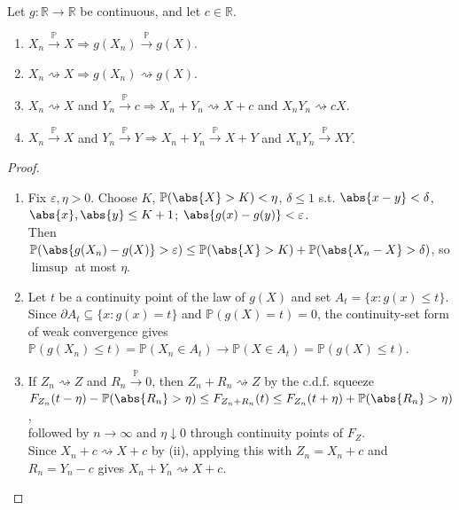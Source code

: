 \begin{theorem} \label{thm:continuous-mapping-and-slutsky} \\
Let $g:\mathbb{R}\to\mathbb{R}$ be continuous, and let $c\in\mathbb{R}$.
\begin{enumerate}[label=(\roman*)]
\setlength{\itemsep}{0pt}
\item $X_n\xrightarrow{\mathbb{P}}X\Rightarrow g(X_n)\xrightarrow{\mathbb{P}}g(X)$.
\item $X_n\rightsquigarrow X\Rightarrow g(X_n)\rightsquigarrow g(X)$.
\item $X_n\rightsquigarrow X$ and $Y_n\xrightarrow{\mathbb{P}}c\Rightarrow X_n+Y_n\rightsquigarrow X+c$ and $X_nY_n\rightsquigarrow cX$.
\item $X_n\xrightarrow{\mathbb{P}}X$ and $Y_n\xrightarrow{\mathbb{P}}Y\Rightarrow X_n+Y_n\xrightarrow{\mathbb{P}}X+Y$ and $X_nY_n\xrightarrow{\mathbb{P}}XY$.
\end{enumerate}
\begin{proof}
\begin{enumerate}[label=(\roman*)]
\setlength{\itemsep}{0pt}
\item Fix $\varepsilon,\eta>0$. Choose $K$, $\mathbb{P}(\abs{X}>K)<\eta$, $\delta\leq1$ s.t. $\abs{x-y}<\delta$, $\abs{x},\abs{y}\leq K+1$; $\abs{g(x)-g(y)}<\varepsilon$.\\
Then $\mathbb{P}(\abs{g(X_n)-g(X)}>\varepsilon)\leq\mathbb{P}(\abs{X}>K)+\mathbb{P}(\abs{X_n-X}>\delta)$, so $\limsup$ at most $\eta$.
\item Let $t$ be a continuity point of the law of $g(X)$ and set $A_t=\{x:g(x)\leq t\}$.\\
Since $\partial A_t\subseteq\{x:g(x)=t\}$ and $\mathbb{P}(g(X)=t)=0$, the continuity-set form of weak convergence gives\\
$\mathbb{P}(g(X_n)\leq t)=\mathbb{P}(X_n\in A_t)\to\mathbb{P}(X\in A_t)=\mathbb{P}(g(X)\leq t)$.
\item If $Z_n\rightsquigarrow Z$ and $R_n\xrightarrow{\mathbb{P}}0$, then $Z_n+R_n\rightsquigarrow Z$ by the c.d.f. squeeze\\
$F_{Z_n}(t-\eta)-\mathbb{P}(\abs{R_n}>\eta)\leq F_{Z_n+R_n}(t)\leq F_{Z_n}(t+\eta)+\mathbb{P}(\abs{R_n}>\eta)$,\\
followed by $n\to\infty$ and $\eta\downarrow0$ through continuity points of $F_Z$.\\
Since $X_n+c\rightsquigarrow X+c$ by (ii), applying this with $Z_n=X_n+c$ and $R_n=Y_n-c$ gives $X_n+Y_n\rightsquigarrow X+c$.\\

\end{enumerate}
\end{proof}
\end{theorem}
